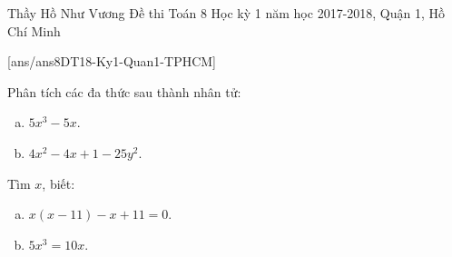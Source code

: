 \begin{name}
{Thầy Hồ Như Vương}
{Đề thi Toán 8 Học kỳ 1 năm học 2017-2018, Quận 1, Hồ Chí Minh }
\end{name}
\setcounter{ex}{0}
[ans/ans8DT18-Ky1-Quan1-TPHCM]
\begin{ex}%
	Phân tích các đa thức sau thành nhân tử:
	\begin{enumerate}[a)]
		\item $5x^3-5x$.
		\item $4x^2-4x+1-25y^2$.
	\end{enumerate}
\end{ex}
\begin{ex}%
	Tìm $x$, biết:
		\begin{enumerate}[a)]
		\item $x(x-11)-x+11=0$.
		\item $5x^3=10x$.
	\end{enumerate}
	\loigiai{
		\begin{enumerate}[a)]
			\item $x(x-11)-x+11=0$ $\Leftrightarrow$ $(x-11)(x-1)=0$ $\Leftrightarrow$ $\left[ \begin{array}{l}
			x=11\\
			x=1
			\end{array}\right.$
			\item $5x^3=10x$ $\Leftrightarrow$ $5x(x^2-2)=0$ $\Leftrightarrow$  $\left[\begin{array}{l}
			5x=0\\
			x^2=2
			\end{array}
			 \right.$ $\Leftrightarrow$  $\left[\begin{array}{l}
			 x=0\\
			 x=\pm \sqrt{2}
			 \end{array}
			 \right.$
		\end{enumerate}
	}
\end{ex}
